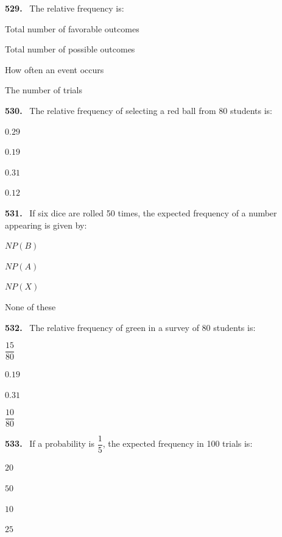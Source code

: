 \documentclass[11pt]{article}
\newenvironment{qenv}[1]{%
  \par\medskip\noindent\textbf{#1.}\ \ignorespaces
}{\par}
\begin{document}
\begin{qenv}{529} The relative frequency is:
\begin{options} \item Total number of favorable outcomes \item Total number of possible outcomes \item How often an event occurs \item The number of trials \end{options} \end{qenv}

\begin{qenv}{530} The relative frequency of selecting a red ball from 80 students is:
\begin{options} \item $0.29$ \item $0.19$ \item $0.31$ \item $0.12$ \end{options} \end{qenv}

\begin{qenv}{531} If six dice are rolled 50 times, the expected frequency of a number appearing is given by:
\begin{options} \item $NP(B)$ \item $NP(A)$ \item $NP(X)$ \item None of these \end{options} \end{qenv}

\begin{qenv}{532} The relative frequency of green in a survey of 80 students is:
\begin{options} \item $\dfrac{15}{80}$ \item $0.19$ \item $0.31$ \item $\dfrac{10}{80}$ \end{options} \end{qenv}

\begin{qenv}{533} If a probability is $\dfrac{1}{5}$, the expected frequency in 100 trials is:
\begin{options} \item $20$ \item $50$ \item $10$ \item $25$ \end{options} \end{qenv}
\end{document}
